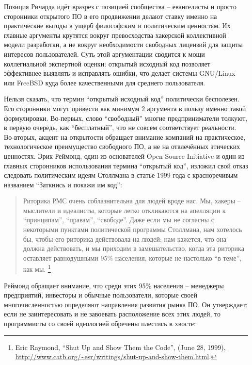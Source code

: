 Позиция Ричарда идёт вразрез с позицией сообщества -- евангелисты и просто сторонники открытого ПО в его продвижении делают ставку именно на практические выгоды в ущерб философским и политическим ценностям. Их главные аргументы крутятся вокруг превосходства хакерской коллективной модели разработки, а не вокруг необходимости свободных лицензий для защиты интересов пользователей. Суть этой аргументации сводится к мощи коллегиальной экспертной оценки: открытый исходный код позволяет эффективнее выявлять и исправлять ошибки, что делает системы GNU/Linux или FreeBSD куда более качественными для среднего пользователя.

Нельзя сказать, что термин \enquote{открытый исходный код} политически бесполезен. Его сторонники могут привести как минимум 2 аргумента в пользу именно такой формулировки. Во-первых, слово \enquote{свободный} многие предприниматели толкуют, в первую очередь, как \enquote{бесплатный}, что не совсем соответствует реальности. Во-вторых, акцент на открытости обращает внимание компаний на практическое, технологическое преимущество свободного ПО, а не на отвлечённых этических ценностях. Эрик Реймонд, один из основателей Open Source Initiative и один из главных сторонников использования термина \enquote{открытый код}, изложил свой отказ следовать политическим идеям Столлмана в статье 1999 года с красноречивым названием \enquote{Заткнись и покажи им код}:

\begin{quote}
Риторика РМС очень соблазнительна для людей вроде нас. Мы, хакеры -- мыслители и идеалисты, которые легко откликаются на апелляции к \enquote{принципам}, \enquote{правам}, \enquote{свободе}. Даже если мы не согласны с некоторыми пунктами политической программы Столлмана, нам хотелось бы, чтобы его риторика действовала на людей; нам кажется, что она должна действовать, и мы приходим в замешательство, когда эта риторика оставляет равнодушными 95\% населения, которые не настолько \enquote{в теме}, как мы. \footnote{Eric Raymond, \enquote{Shut Up and Show Them the Code}, (June 28, 1999), \url{http://www.catb.org/~esr/writings/shut-up-and-show-them.html}.}
\end{quote}

Реймонд обращает внимание, что среди этих 95\% населения -- менеджеры предприятий, инвесторы и обычные пользователи, которые своей многочисленностью определяют направления развития рынка ПО. Он утверждает: если не заинтересовать и не завоевать расположение всех этих людей, то программисты со своей идеологией обречены плестись в хвосте:

